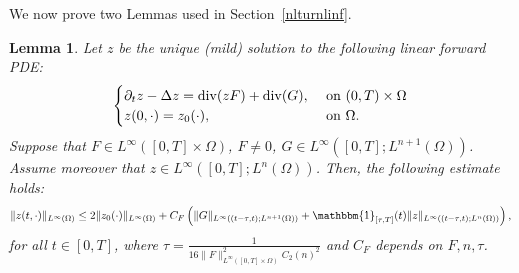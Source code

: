 \documentclass[10pt,a4paper,nouppercase,nowrite]{article}
\numberwithin{equation}{section}
\newtheorem{lem}[defn]{Lemma}
\theoremstyle{definition}
\begin{document}
We now prove two Lemmas used in Section~\ref{nlturnlinf}.
	\begin{lem}	\label{app1}
		Let $z$ be the unique (mild) solution to the following linear forward PDE:
		\begin{equation*}
			\begin{cases}
				\partial_t z - \Delta z = {\rm div}(z F) + {\rm div}(G),& \text{ on } (0,T) \times \Omega \\
				z(0,\cdot)=z_0(\cdot),& \text{ on } \Omega. \\
			\end{cases}
		\end{equation*}
		Suppose that $F \in L^{\infty}([0,T] \times \Omega)$, $F \neq 0$, $G \in L^{\infty}([0,T];L^{n+1}(\Omega))$.
		Assume moreover that $z \in L^{\infty}([0,T];L^{n}(\Omega))$. Then, the following estimate holds:
		\begin{equation}
			\| z(t,\cdot) \|_{L^{\infty}(\Omega)} \le 2 \| z_0(\cdot) \|_{L^{\infty}(\Omega)} + C_F \left( \| G \|_{L^{\infty}((t-\tau,t); L^{n+1}(\Omega))} + \mathbbm{1}_{[\tau,T]}(t) \| z \|_{L^{\infty}((t-\tau,t);L^n(\Omega))} \right),
			\label{estapp1}
		\end{equation}
		for all $t \in [0,T]$, where $\tau=\frac{1}{16 \| F \|^2_{L^{\infty}([0,T] \times \Omega)} C_2(n)^2}$ and $C_F$ depends on $F,n,\tau$.
	\end{lem}
\end{document}
